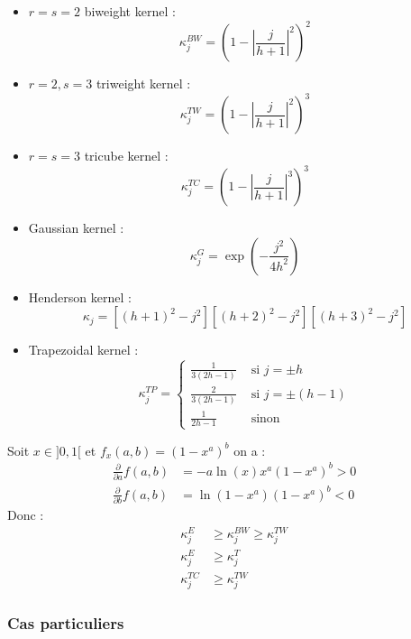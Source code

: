 \documentclass[
  12pt,
  ,
  french]{article}
\begin{document}
\begin{multicols}{2}
\begin{itemize}

\item $r=s=2$ biweight kernel :
$$\kappa_j^{BW}=\left(
  1-
  \left\lvert
  \frac j {h+1}
  \right\lvert^2
\right)^2$$

\item $r = 2, s = 3$ triweight kernel :
$$\kappa_j^{TW}=\left(
  1-
  \left\lvert
  \frac j {h+1}
  \right\lvert^2
\right)^3$$

\item $r = s = 3$ tricube kernel :
$$\kappa_j^{TC}=\left(
  1-
  \left\lvert
  \frac j {h+1}
  \right\lvert^3
\right)^3$$

\item Gaussian kernel  :
$$
\kappa_j^G=\exp\left(
-\frac{
  j^2
}{
  4h^2
}\right)
$$
\item Henderson kernel :
$$
\kappa_{j}=\left[(h+1)^{2}-j^{2}\right]\left[(h+2)^{2}-j^{2}\right]\left[(h+3)^{2}-j^{2}\right]
$$

\item Trapezoidal kernel :
$$
\kappa_j^{TP}=
\begin{cases}
  \frac{1}{3(2h-1)} & \text{ si }j=\pm h 
  \\
  \frac{2}{3(2h-1)} & \text{ si }j=\pm (h-1)\\
  \frac{1}{2h-1}& \text{ sinon}
\end{cases}
$$

\end{itemize}
\end{multicols}

Soit \(x\in ]0,1[\) et \(f_x(a,b)=\left(1-x^{a}\right)^{b}\)
on a :
\begin{align*}
\frac{\partial}{\partial a}f(a,b) &=-a\ln (x)x^a(1-x^{a})^{b}>0 \\
\frac{\partial}{\partial b}f(a,b)&=\ln(1-x^{a})(1-x^{a})^{b} <0
\end{align*}
Donc :
\begin{align*}
\kappa_j^{E}&\geq \kappa_j^{BW} \geq \kappa_j^{TW} \\
\kappa_j^{E}&\geq \kappa_j^T \\
\kappa_j^{TC} &\geq \kappa_j^{TW}
\end{align*}

\hypertarget{cas-particuliers}{%
\subsubsection{Cas particuliers}\label{cas-particuliers}}
\end{document}
